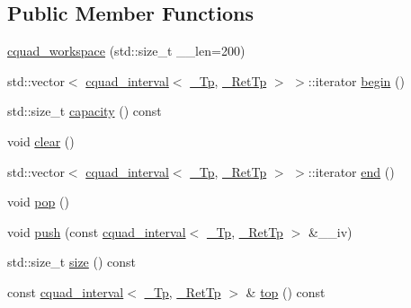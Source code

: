 \subsection*{Public Member Functions}
\begin{DoxyCompactItemize}
\item 
\hyperlink{struct____gnu__cxx_1_1cquad__workspace_a3d7601160fd8f630b70109b61f493738}{cquad\+\_\+workspace} (std\+::size\+\_\+t \+\_\+\+\_\+len=200)
\item 
std\+::vector$<$ \hyperlink{struct____gnu__cxx_1_1cquad__interval}{cquad\+\_\+interval}$<$ \hyperlink{namespace____gnu__cxx_a3b19a9c800ca194374ef9172290f7d79}{\+\_\+\+Tp}, \hyperlink{namespace____gnu__cxx_a886e03ece3d53ff7fa6c098a40f93fa5}{\+\_\+\+Ret\+Tp} $>$ $>$\+::iterator \hyperlink{struct____gnu__cxx_1_1cquad__workspace_adf18a306dbf58cb00b4c6254266816bc}{begin} ()
\item 
std\+::size\+\_\+t \hyperlink{struct____gnu__cxx_1_1cquad__workspace_a379ef600e71c787579e107ffef46fcdf}{capacity} () const
\item 
void \hyperlink{struct____gnu__cxx_1_1cquad__workspace_ac3b3e8c4e17571349b56ac1635789b34}{clear} ()
\item 
std\+::vector$<$ \hyperlink{struct____gnu__cxx_1_1cquad__interval}{cquad\+\_\+interval}$<$ \hyperlink{namespace____gnu__cxx_a3b19a9c800ca194374ef9172290f7d79}{\+\_\+\+Tp}, \hyperlink{namespace____gnu__cxx_a886e03ece3d53ff7fa6c098a40f93fa5}{\+\_\+\+Ret\+Tp} $>$ $>$\+::iterator \hyperlink{struct____gnu__cxx_1_1cquad__workspace_a61729a1acaa035013ebb0ed6e4ffcbf4}{end} ()
\item 
void \hyperlink{struct____gnu__cxx_1_1cquad__workspace_a34cca20d45326741147cf0397a63a9e9}{pop} ()
\item 
void \hyperlink{struct____gnu__cxx_1_1cquad__workspace_ab8b17ed5aea295adbf9a70b84498c948}{push} (const \hyperlink{struct____gnu__cxx_1_1cquad__interval}{cquad\+\_\+interval}$<$ \hyperlink{namespace____gnu__cxx_a3b19a9c800ca194374ef9172290f7d79}{\+\_\+\+Tp}, \hyperlink{namespace____gnu__cxx_a886e03ece3d53ff7fa6c098a40f93fa5}{\+\_\+\+Ret\+Tp} $>$ \&\+\_\+\+\_\+iv)
\item 
std\+::size\+\_\+t \hyperlink{struct____gnu__cxx_1_1cquad__workspace_aafe82f4041e233329f4510ca34a9e619}{size} () const
\item 
const \hyperlink{struct____gnu__cxx_1_1cquad__interval}{cquad\+\_\+interval}$<$ \hyperlink{namespace____gnu__cxx_a3b19a9c800ca194374ef9172290f7d79}{\+\_\+\+Tp}, \hyperlink{namespace____gnu__cxx_a886e03ece3d53ff7fa6c098a40f93fa5}{\+\_\+\+Ret\+Tp} $>$ \& \hyperlink{struct____gnu__cxx_1_1cquad__workspace_a6da1e7fd72a9a94fba84699b4f10a3b6}{top} () const

\end{DoxyCompactItemize}
